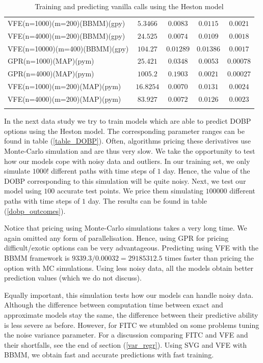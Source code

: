 \documentclass[12pt,a4paper,oneside]{book}
\begin{document}
\begin{table}
\begin{tabular}[t]{lcccc}
VFE(n=1000)(m=200)(BBMM)(gpy)  & $5.3466$   & $0.0083$ & $0.0115$ & $0.0021$    \\\addlinespace
VFE(n=4000)(m=200)(BBMM)(gpy)  &  $24.525$  & $0.0074$ & $0.0109$ &  $0.0018$   \\\addlinespace
VFE(n=10000)(m=400)(BBMM)(gpy) &$104.27$ & $0.01289$ & $0.01386$ &  $0.0017$  \\\addlinespace
GPR(n=1000)(MAP)(pym)  & $25.421$   & $0.0348$  & $0.0053$ &  $0.00078$   \\\addlinespace
GPR(n=4000)(MAP)(pym)  & $1005.2$   & $0.1903$ & $\bm{0.0021}$ &  $\bm{0.00027}$   \\\addlinespace
VFE(n=1000)(m=200)(MAP)(pym)  &  $16.8254$  & $0.0070$ & $0.0131$  & $0.0024$    \\\addlinespace
VFE(n=4000)(m=200)(MAP)(pym)  & $83.927$   & $0.0072$ & $0.0126$ & $0.0023$    \\\addlinespace
\\\bottomrule
\end{tabular}
\caption{Training and predicting vanilla calls using the Heston model}\label{Result_Heston_Vanilla_Call}
\end{table}

In the next data study we try to train models which are able to predict DOBP options using the Heston model. The corresponding parameter ranges can be found in table (\ref{table_DOBP}). Often, algorithms pricing these derivatives use Monte-Carlo simulation and are thus very slow. We take the opportunity to test how our models cope with noisy data and outliers. In our training set, we only simulate $1000$! different paths with time steps of $1$ day. Hence, the value of the DOBP corresponding to this simulation will be quite noisy. Next, we test our model using $100$ accurate test points. We price them simulating $100000$ different paths with time steps of $1$ day.  The results can be found in table (\ref{dobp_outcomes}). 

Notice that pricing using Monte-Carlo simulations takes a very long time. We again omitted any form of parallelisation. Hence, using GPR for pricing difficult/exotic options can be very advantageous. Predicting using VFE with the BBMM framework is $9339.3 / 0.00032 = 29185312.5$  times faster than pricing the option with MC simulations. Using less noisy data, all the models obtain better prediction values (which we do not discuss). 

Equally important, this simulation tests how our models can handle noisy data. Although the difference between computation time between exact and approximate models stay the same, the difference between their predictive ability is less severe as before.  However, for FITC we stumbled on some problems tuning the noise variance parameter. For a discussion comparing FITC and VFE and their shortfalls, see the end of section (\ref{var_regr}). Using SVG and VFE with BBMM, we obtain fast and accurate predictions with fast training. 
\end{document}
